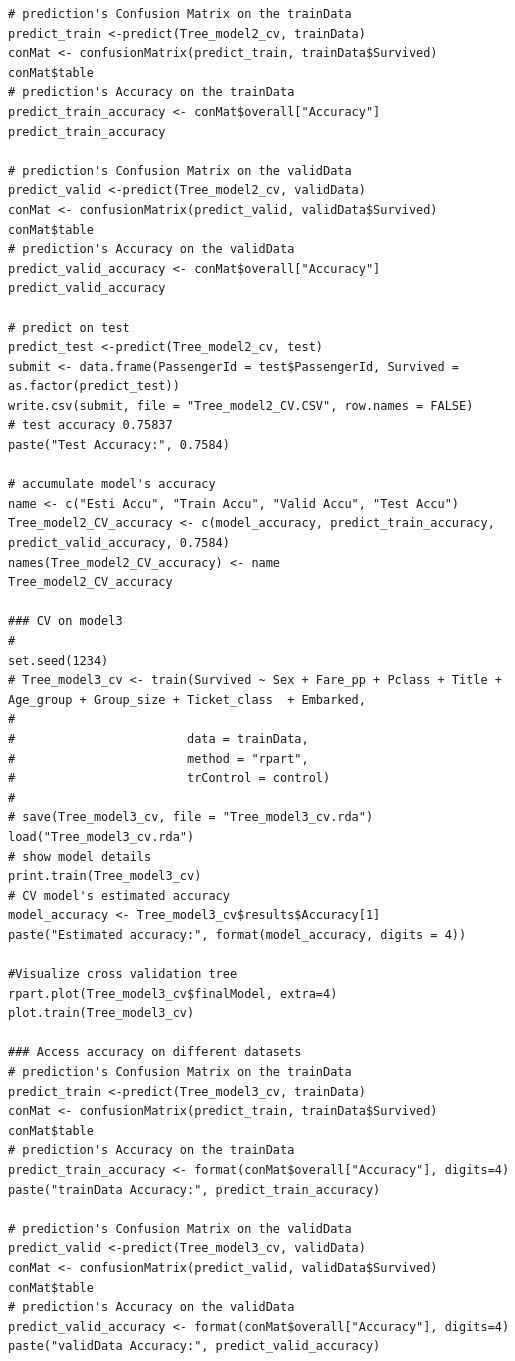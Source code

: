 \documentclass[
]{book}
\begin{document}
\begin{verbatim}
# prediction's Confusion Matrix on the trainData
predict_train <-predict(Tree_model2_cv, trainData)
conMat <- confusionMatrix(predict_train, trainData$Survived)
conMat$table
# prediction's Accuracy on the trainData
predict_train_accuracy <- conMat$overall["Accuracy"]
predict_train_accuracy

# prediction's Confusion Matrix on the validData
predict_valid <-predict(Tree_model2_cv, validData)
conMat <- confusionMatrix(predict_valid, validData$Survived)
conMat$table
# prediction's Accuracy on the validData
predict_valid_accuracy <- conMat$overall["Accuracy"]
predict_valid_accuracy

# predict on test
predict_test <-predict(Tree_model2_cv, test)
submit <- data.frame(PassengerId = test$PassengerId, Survived = as.factor(predict_test))
write.csv(submit, file = "Tree_model2_CV.CSV", row.names = FALSE)
# test accuracy 0.75837
paste("Test Accuracy:", 0.7584)

# accumulate model's accuracy
name <- c("Esti Accu", "Train Accu", "Valid Accu", "Test Accu")
Tree_model2_CV_accuracy <- c(model_accuracy, predict_train_accuracy, predict_valid_accuracy, 0.7584)
names(Tree_model2_CV_accuracy) <- name
Tree_model2_CV_accuracy

### CV on model3
#
set.seed(1234)
# Tree_model3_cv <- train(Survived ~ Sex + Fare_pp + Pclass + Title + Age_group + Group_size + Ticket_class  + Embarked,
#
#                        data = trainData,
#                        method = "rpart",
#                        trControl = control)
#
# save(Tree_model3_cv, file = "Tree_model3_cv.rda")
load("Tree_model3_cv.rda")
# show model details
print.train(Tree_model3_cv)
# CV model's estimated accuracy
model_accuracy <- Tree_model3_cv$results$Accuracy[1]
paste("Estimated accuracy:", format(model_accuracy, digits = 4))

#Visualize cross validation tree
rpart.plot(Tree_model3_cv$finalModel, extra=4)
plot.train(Tree_model3_cv)

### Access accuracy on different datasets
# prediction's Confusion Matrix on the trainData
predict_train <-predict(Tree_model3_cv, trainData)
conMat <- confusionMatrix(predict_train, trainData$Survived)
conMat$table
# prediction's Accuracy on the trainData
predict_train_accuracy <- format(conMat$overall["Accuracy"], digits=4)
paste("trainData Accuracy:", predict_train_accuracy)

# prediction's Confusion Matrix on the validData
predict_valid <-predict(Tree_model3_cv, validData)
conMat <- confusionMatrix(predict_valid, validData$Survived)
conMat$table
# prediction's Accuracy on the validData
predict_valid_accuracy <- format(conMat$overall["Accuracy"], digits=4)
paste("validData Accuracy:", predict_valid_accuracy)


\end{verbatim}
\end{document}
